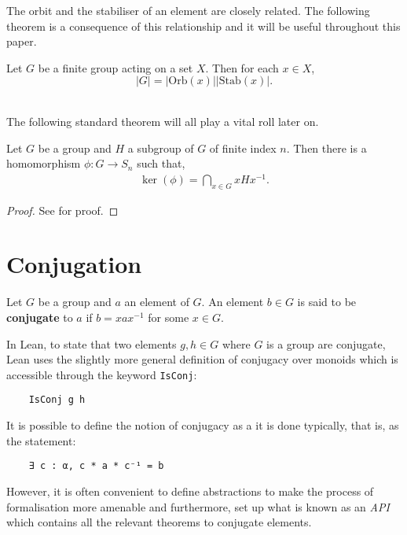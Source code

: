 The orbit and the stabiliser of an element are closely related. 
The following theorem is a consequence of this relationship and it will be useful throughout this paper. \\

\begin{theorem}
    Let $G$ be a finite group acting on a set $X$. Then for each $x \in X$, $$|G| = |\textrm{Orb}(x)| |\textrm{Stab}(x)|.$$ \\
\end{theorem}

The following standard theorem will all play a vital roll later on.

\begin{theorem}
    \label{symhomoker}
     Let $G$ be a group and $H$ a subgroup of $G$ of finite index $n$. Then there is a homomorphism $\phi : G \longrightarrow S_n$ such that,
\begin{align*} \ker(\phi) = \bigcap\limits_{x \in G} x H x^{-1}.
\end{align*}
\end{theorem}

\begin{proof} 
    See \cite[p.110]{bhattacharya} for proof.
\end{proof}

\section{Conjugation}

\begin{definition}
Let $G$ be a group and $a$ an element of $G$. An element $b \in G$ is said to be \textbf{conjugate} to $a$ if $b=xax^{-1}$ for some $x \in G$. \\
\end{definition}

\begin{remark}
\label{conj_elem}
In Lean, to state that two elements $g, h \in G$ where $G$ is a group are conjugate, 
Lean uses the slightly more general definition of conjugacy over monoids which is accessible through
the keyword \texttt{IsConj}:

\begin{verbatim}
    IsConj g h
\end{verbatim}

It is possible to define the notion of conjugacy as a it is done typically, that is, as the statement:

\begin{footnotesize}
    \begin{verbatim}
    ∃ c : α, c * a * c⁻¹ = b
    \end{verbatim}  
    \end{footnotesize}

However, it is often convenient to define abstractions to make the process of formalisation more amenable and furthermore,
set up what is known as an \textit{API} which contains all the relevant theorems to conjugate elements.

\end{remark}



